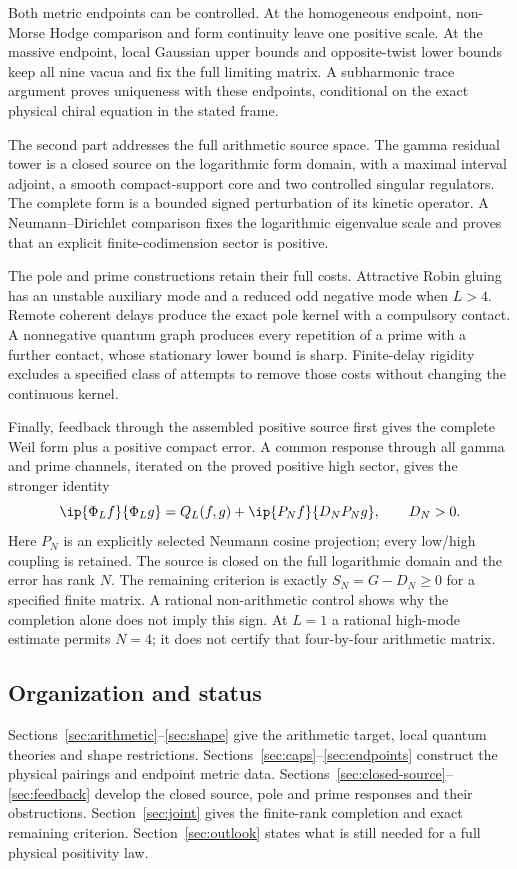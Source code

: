 Both metric endpoints can be controlled. At the homogeneous
endpoint, non-Morse Hodge comparison and form continuity leave
one positive scale. At the massive endpoint, local Gaussian upper
bounds and opposite-twist lower bounds keep all nine vacua and
fix the full limiting matrix. A subharmonic trace argument proves
uniqueness with these endpoints, conditional on the exact
physical chiral equation in the stated frame.

The second part addresses the full arithmetic source space.
The gamma residual tower is a closed source on the logarithmic
form domain, with a maximal interval adjoint, a smooth
compact-support core and two controlled singular regulators.
The complete form is a bounded signed perturbation of its
kinetic operator. A Neumann--Dirichlet comparison fixes the
logarithmic eigenvalue scale and proves that an explicit
finite-codimension sector is positive.

The pole and prime constructions retain their full costs.
Attractive Robin gluing has an unstable auxiliary mode and a
reduced odd negative mode when $L>4$. Remote coherent delays
produce the exact pole kernel with a compulsory contact.
A nonnegative quantum graph produces every repetition of a
prime with a further contact, whose stationary lower bound is
sharp. Finite-delay rigidity excludes a specified class of
attempts to remove those costs without changing the continuous
kernel.

Finally, feedback through the assembled positive source first
gives the complete Weil form plus a positive compact error.
A common response through all gamma and prime channels,
iterated on the proved positive high sector, gives the stronger
identity
\begin{equation}\label{intro:finite-completion}
\ip{\Phi_Lf}{\Phi_Lg}
=Q_L(f,g)+\ip{P_Nf}{D_NP_Ng},\qquad D_N>0.
\end{equation}
Here $P_N$ is an explicitly selected Neumann cosine projection;
every low/high coupling is retained. The source is closed on
the full logarithmic domain and the error has rank $N$.
The remaining criterion is exactly $S_N=G-D_N\ge0$ for a
specified finite matrix. A rational non-arithmetic control
shows why the completion alone does not imply this sign.
At $L=1$ a rational high-mode estimate permits $N=4$; it does
not certify that four-by-four arithmetic matrix.

\subsection{Organization and status}
Sections~\ref{sec:arithmetic}--\ref{sec:shape} give the arithmetic
target, local quantum theories and shape restrictions.
Sections~\ref{sec:caps}--\ref{sec:endpoints} construct the physical
pairings and endpoint metric data.
Sections~\ref{sec:closed-source}--\ref{sec:feedback} develop the
closed source, pole and prime responses and their obstructions.
Section~\ref{sec:joint} gives the finite-rank completion and exact
remaining criterion. Section~\ref{sec:outlook} states what is
still needed for a full physical positivity law.
